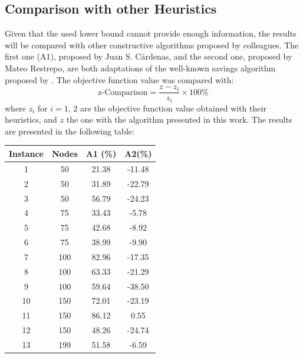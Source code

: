 \documentclass[10pt,twoside]{article}
\begin{document}
\subsection{Comparison with other Heuristics}
Given that the used lower bound cannot provide enough information, the results will be compared with other constructive algorithms proposed by colleagues. The first one (A1), proposed by Juan S. Cárdenas, and the second one, proposed by Mateo Restrepo, are both adaptations of the well-known savings algorithm proposed by \cite{clarke1964scheduling}. The objective function value was compared with:
\[\text{z-Comparison}=\dfrac{z-z_{i}}{z_{i}}\times100\%\]
where $z_i$ for $i=1,\,2$ are the objective function value obtained with their heuristics, and $z$ the one with the algorithm presented in this work. The results are presented in the following table:
\begin{table}[H]
\centering
\begin{tabular}{cccc}
\hline
\textbf{Instance} & \textbf{Nodes} & \textbf{A1 (\%)} & \textbf{A2(\%)} \\ \hline
1                 & 50             & 21.38            & -11.48          \\
2                 & 50             & 31.89            & -22.79          \\
3                 & 50             & 56.79            & -24.23          \\
4                 & 75             & 33.43            & -5.78           \\
5                 & 75             & 42.68            & -8.92           \\
6                 & 75             & 38.99            & -9.90           \\
7                 & 100            & 82.96            & -17.35          \\
8                 & 100            & 63.33            & -21.29          \\
9                 & 100            & 59.64            & -38.50          \\
10                & 150            & 72.01            & -23.19          \\
11                & 150            & 86.12            & 0.55            \\
12                & 150            & 48.26            & -24.74          \\
13                & 199            & 51.58            & -6.59           \\

\end{tabular}
\end{table}
\end{document}
